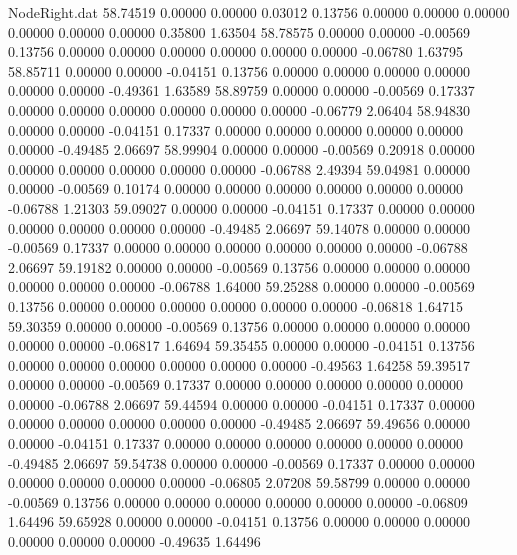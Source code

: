 \begin{filecontents}{NodeRight.dat}
  58.74519    0.00000    0.00000     0.03012    0.13756    0.00000    0.00000    0.00000    0.00000    0.00000    0.00000    0.35800    1.63504
  58.78575    0.00000    0.00000    -0.00569    0.13756    0.00000    0.00000    0.00000    0.00000    0.00000    0.00000   -0.06780    1.63795
  58.85711    0.00000    0.00000    -0.04151    0.13756    0.00000    0.00000    0.00000    0.00000    0.00000    0.00000   -0.49361    1.63589
  58.89759    0.00000    0.00000    -0.00569    0.17337    0.00000    0.00000    0.00000    0.00000    0.00000    0.00000   -0.06779    2.06404
  58.94830    0.00000    0.00000    -0.04151    0.17337    0.00000    0.00000    0.00000    0.00000    0.00000    0.00000   -0.49485    2.06697
  58.99904    0.00000    0.00000    -0.00569    0.20918    0.00000    0.00000    0.00000    0.00000    0.00000    0.00000   -0.06788    2.49394
  59.04981    0.00000    0.00000    -0.00569    0.10174    0.00000    0.00000    0.00000    0.00000    0.00000    0.00000   -0.06788    1.21303
  59.09027    0.00000    0.00000    -0.04151    0.17337    0.00000    0.00000    0.00000    0.00000    0.00000    0.00000   -0.49485    2.06697
  59.14078    0.00000    0.00000    -0.00569    0.17337    0.00000    0.00000    0.00000    0.00000    0.00000    0.00000   -0.06788    2.06697
  59.19182    0.00000    0.00000    -0.00569    0.13756    0.00000    0.00000    0.00000    0.00000    0.00000    0.00000   -0.06788    1.64000
  59.25288    0.00000    0.00000    -0.00569    0.13756    0.00000    0.00000    0.00000    0.00000    0.00000    0.00000   -0.06818    1.64715
  59.30359    0.00000    0.00000    -0.00569    0.13756    0.00000    0.00000    0.00000    0.00000    0.00000    0.00000   -0.06817    1.64694
  59.35455    0.00000    0.00000    -0.04151    0.13756    0.00000    0.00000    0.00000    0.00000    0.00000    0.00000   -0.49563    1.64258
  59.39517    0.00000    0.00000    -0.00569    0.17337    0.00000    0.00000    0.00000    0.00000    0.00000    0.00000   -0.06788    2.06697
  59.44594    0.00000    0.00000    -0.04151    0.17337    0.00000    0.00000    0.00000    0.00000    0.00000    0.00000   -0.49485    2.06697
  59.49656    0.00000    0.00000    -0.04151    0.17337    0.00000    0.00000    0.00000    0.00000    0.00000    0.00000   -0.49485    2.06697
  59.54738    0.00000    0.00000    -0.00569    0.17337    0.00000    0.00000    0.00000    0.00000    0.00000    0.00000   -0.06805    2.07208
  59.58799    0.00000    0.00000    -0.00569    0.13756    0.00000    0.00000    0.00000    0.00000    0.00000    0.00000   -0.06809    1.64496
  59.65928    0.00000    0.00000    -0.04151    0.13756    0.00000    0.00000    0.00000    0.00000    0.00000    0.00000   -0.49635    1.64496

\end{filecontents}
